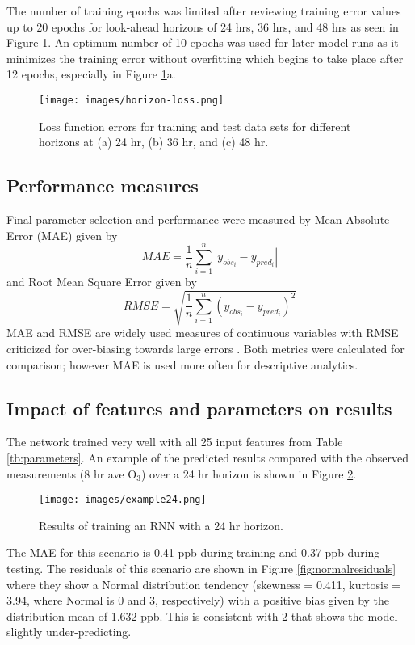 The number of training epochs was limited after reviewing training error values up to 20 epochs for look-ahead horizons of 24 hrs, 36 hrs, and 48 hrs as seen in Figure \ref{fig:horizon-loss}. An optimum number of 10 epochs was used for later model runs as it minimizes the training error without overfitting which begins to take place after 12 epochs, especially in Figure \ref{fig:horizon-loss}a. 
%
\begin{figure}[H]
\centering
\texttt{[image: images/horizon-loss.png]}
\caption[Loss function errors of training and test data sets]{Loss function errors for training and test data sets for different horizons at (a) 24 hr, (b) 36 hr, and (c) 48 hr.}
\label{fig:horizon-loss}
\end{figure}
%

\subsection{Performance measures}

Final parameter selection and performance were measured by Mean Absolute Error (MAE) given by 
%
\begin{equation}
\label{eq:MAE}
MAE = \frac{1}{n}\sum^{n}_{i=1} \left | y_{obs_{i}}- y_{pred_{i}} \right |
\end{equation}
%
and Root Mean Square Error given by
%
\begin{equation}
\label{eq:RMSE}
RMSE = \sqrt{\frac{1}{n}\sum^{n}_{i=1} \left ( y_{obs_{i}}- y_{pred_{i}} \right )^{2}}
\end{equation}
%
MAE and RMSE are widely used measures of continuous variables with RMSE criticized for over-biasing towards large errors \citep{Chai2014, Willmott2005}. Both metrics were calculated for comparison; however MAE is used more often for descriptive analytics.

\subsection{Impact of features and parameters on results}

The network trained very well with all 25 input features from Table \ref{tb:parameters}. An example of the predicted results compared with the observed measurements (8 hr ave O$_{3}$) over a 24 hr horizon is shown in Figure \ref{fig:example24}.
%
\begin{figure}[H]
\centering
\texttt{[image: images/example24.png]}
\caption{Results of training an RNN with a 24 hr horizon.}
\label{fig:example24}
\end{figure}
%
The MAE for this scenario is 0.41 ppb during training and 0.37 ppb during testing. The residuals of this scenario are shown in Figure \ref{fig:normalresiduals} where they show a Normal distribution tendency (skewness = 0.411, kurtosis = 3.94, where Normal is 0 and 3, respectively) with a positive bias given by the distribution mean of 1.632 ppb. This is consistent with \ref{fig:example24} that shows the model slightly under-predicting.

